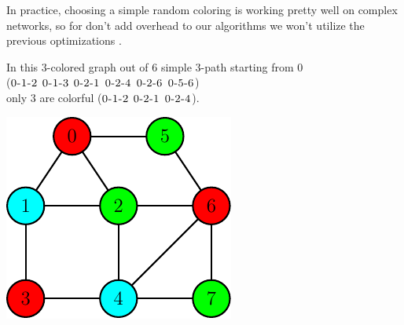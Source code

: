 In practice, choosing a simple random coloring is working pretty well on complex networks, 
so for don't add overhead to our algorithms we won't utilize the previous optimizations .\\


	\begin{minipage}{0.55\textwidth}\raggedright
		\begin{esempio}
		\end{esempio}
		
		In this $3$-colored graph out of $6$ simple $3$-path starting from $0$\\
		($\textsc{0-1-2}$ $\textsc{0-1-3}$ $\textsc{0-2-1}$ $\textsc{0-2-4}$ $\textsc{0-2-6}$ $\textsc{0-5-6}$)\\ 
		only $3$ are colorful ($\textsc{0-1-2}$ $\textsc{0-2-1}$ $\textsc{0-2-4}$).
	\end{minipage}
	\begin{minipage}{0.35\textwidth}
		\includegraphics[width=\linewidth]{figure/figure-2-6}
	\end{minipage}

\noindent
\\

\clearpage
